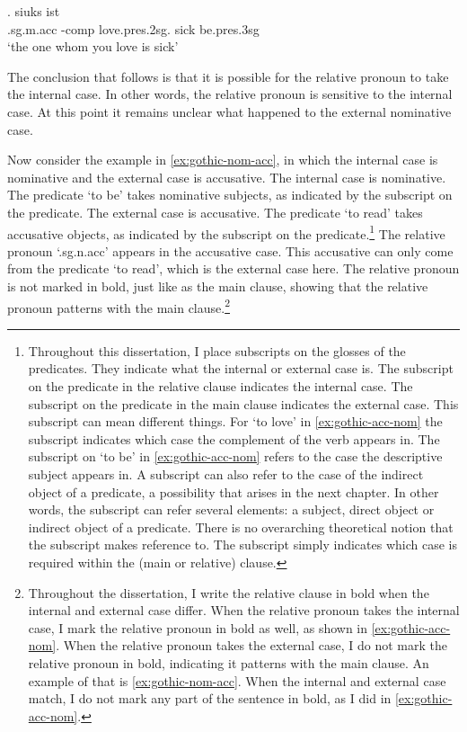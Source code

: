 \exg.    siuks ist\\
 .\ac{sg}.\ac{m}.\ac{acc} -\ac{comp} love.\ac{pres}.2\ac{sg}.\scsub{[acc]} sick be.\ac{pres}.3\ac{sg}\scsub{[nom]}\\
 `the one whom you love is sick' \label{ex:gothic-acc-nom}

The conclusion that follows is that it is possible for the relative pronoun to take the internal case. In other words, the relative pronoun is sensitive to the internal case.
At this point it remains unclear what happened to the external nominative case.

Now consider the example in \ref{ex:gothic-nom-acc}, in which the internal case is nominative and the external case is accusative.
The internal case is nominative. The predicate  `to be' takes nominative subjects, as indicated by the subscript on the predicate.
The external case is accusative. The predicate  `to read' takes accusative objects, as indicated by the subscript on the predicate.\footnote{
Throughout this dissertation, I place subscripts on the glosses of the predicates. They indicate what the internal or external case is. The subscript on the predicate in the relative clause indicates the internal case. The subscript on the predicate in the main clause indicates the external case. This subscript can mean different things.
For  `to love' in \ref{ex:gothic-acc-nom} the subscript indicates which case the complement of the verb appears in. The subscript on  `to be' in \ref{ex:gothic-acc-nom} refers to the case the descriptive subject appears in. A subscript can also refer to the case of the indirect object of a predicate, a possibility that arises in the next chapter.
In other words, the subscript can refer several elements: a subject, direct object or indirect object of a predicate. There is no overarching theoretical notion that the subscript makes reference to. The subscript simply indicates which case is required within the (main or relative) clause.
}
The relative pronoun  `.\ac{sg}.\ac{n}.\ac{acc}' appears in the accusative case. This accusative can only come from the predicate  `to read', which is the external case here. The relative pronoun is not marked in bold, just like as the main clause, showing that the relative pronoun patterns with the main clause.\footnote{
Throughout the dissertation, I write the relative clause in bold when the internal and external case differ. When the relative pronoun takes the internal case, I mark the relative pronoun in bold as well, as shown in \ref{ex:gothic-acc-nom}. When the relative pronoun takes the external case, I do not mark the relative pronoun in bold, indicating it patterns with the main clause. An example of that is \ref{ex:gothic-nom-acc}. When the internal and external case match, I do not mark any part of the sentence in bold, as I did in \ref{ex:gothic-acc-nom}.
}

